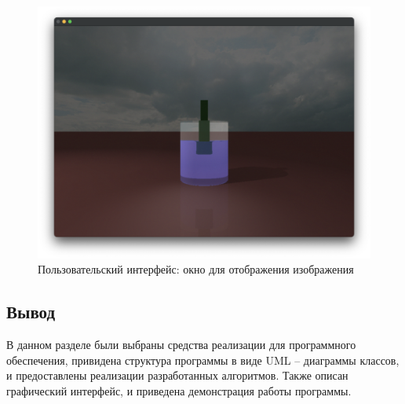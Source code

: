 \newpage
\begin{figure}[ht!]
	\begin{center}
		\includegraphics[scale=0.43]{img/ui-image.png}
	\end{center}
	\caption{Пользовательский интерфейс: окно для отображения изображения}
	\label{ui-img}
\end{figure}

\subsection*{Вывод}

В данном разделе были выбраны средства реализации для программного обеспечения, привидена структура программы в виде UML -- диаграммы классов, и предоставлены реализации разработанных алгоритмов. Также описан графический интерфейс, и приведена демонстрация работы программы.